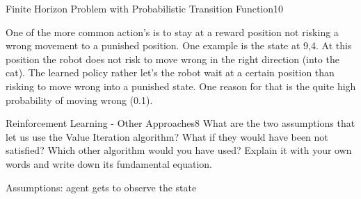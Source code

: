 \begin{questions}
\begin{question}{Finite Horizon Problem with Probabilistic Transition Function}{10}
\begin{answer}
\end{answer}

One of the more common action's is to stay at a reward position not risking a wrong movement to a punished position. One example is the state at 9,4. At this position the robot does not risk to move wrong in the right direction (into the cat). The learned policy rather let's the robot wait at a certain position than risking to move wrong into a punished state. One reason for that is the quite high probability of moving wrong (0.1).

\end{question}



\begin{question}[bonus]{Reinforcement Learning - Other Approaches}{8}
What are the two assumptions that let us use the Value Iteration algorithm? What if they would have been not satisfied? Which other algorithm would you have used? Explain it with your own words and write down its fundamental equation.

\begin{answer}
Assumptions: agent gets to observe the state 	
	
\end{answer}
\end{question}


\end{questions}

